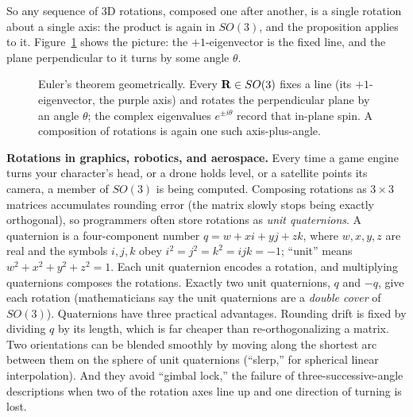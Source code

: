 So any sequence of 3D rotations, composed one after another, is a single rotation
about a single axis: the product is again in $SO(3)$, and the proposition applies
to it.
Figure~\ref{ch37:fig-euleraxis} shows the picture: the $+1$-eigenvector is the
fixed line, and the plane perpendicular to it turns by some angle $\theta$.

\begin{figure}[H]
\centering
{}
\caption{Euler's theorem geometrically. Every $\mathbf{R}\in SO(3)$ fixes a line (its
$+1$-eigenvector, the purple axis) and rotates the perpendicular plane by an angle
$\theta$; the complex eigenvalues $e^{\pm i\theta}$ record that in-plane spin. A
composition of rotations is again one such axis-plus-angle.}
\label{ch37:fig-euleraxis}
\end{figure}

\begin{applicationbox}
\textbf{Rotations in graphics, robotics, and aerospace.} Every time a game engine
turns your character's head, or a drone holds level, or a satellite points its
camera, a member of $SO(3)$ is being computed. Composing rotations as
$3\times 3$ matrices accumulates rounding error (the matrix slowly stops
being exactly orthogonal), so programmers often store rotations as \emph{unit quaternions}.
A quaternion is a four-component number $q = w + x i + y j + z k$, where $w,x,y,z$
are real and the symbols $i,j,k$ obey $i^2=j^2=k^2=ijk=-1$; ``unit'' means
$w^2+x^2+y^2+z^2=1$. Each unit quaternion encodes a rotation, and multiplying
quaternions composes the rotations. Exactly two unit quaternions, $q$ and $-q$,
give each rotation (mathematicians say the unit quaternions are a \emph{double
cover} of $SO(3)$). Quaternions have three practical advantages. Rounding drift is
fixed by dividing $q$ by its length, which is far cheaper than re-orthogonalizing a
matrix. Two orientations can be blended smoothly by moving along the shortest arc
between them on the sphere of unit quaternions (``slerp,'' for spherical linear
interpolation). And they avoid ``gimbal lock,'' the failure of
three-successive-angle descriptions when two of the rotation axes line up and one
direction of turning is lost.
\end{applicationbox}

